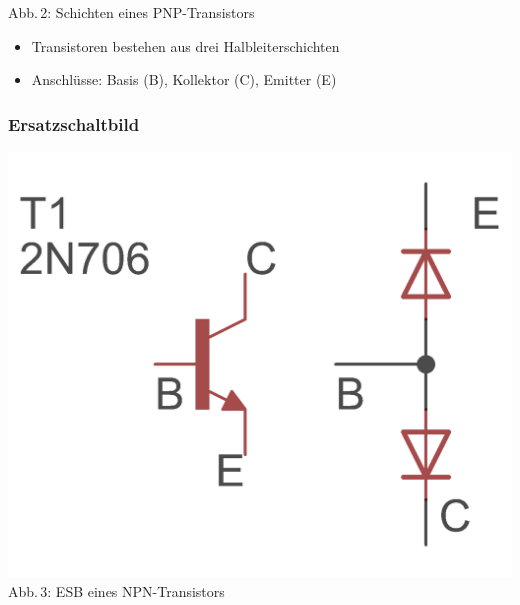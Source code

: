 \begin{frame}
\begin{minipage}{0.4\textwidth}
	{\tiny Abb.\,2: Schichten eines PNP-Transistors}
\end{minipage}
\vspace{0.5cm}
\begin{center}
\begin{itemize}
	\item Transistoren bestehen aus drei Halbleiterschichten
	\item Anschlüsse: Basis (B), Kollektor (C), Emitter (E)
\end{itemize}
\end{center}
\end{frame}

\begin{frame}
\frametitle{Ersatzschaltbild}
\begin{minipage}{0.4\textwidth}
	\includegraphics[width=\textwidth,height=.5\textheight,keepaspectratio]{a06/NPN_esb.png}\\
	{\tiny Abb.\,3: ESB eines NPN-Transistors}
\end{minipage}
\hspace{0.5cm}
\begin{minipage}{0.4\textwidth}

\end{minipage}
\end{frame}
